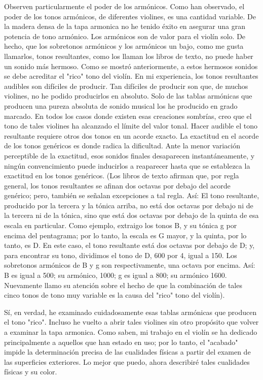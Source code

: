 \documentclass[12pt]{book}
\begin{document}
Observen particularmente el poder de los armónicos. Como han observado, el poder de los tonos armónicos, de diferentes violines, es una cantidad variable. De la madera densa de la tapa armonica no he tenido éxito en asegurar una gran potencia de tono armónico. Los armónicos son de valor para el violín solo. De hecho, que los sobretonos armónicos y los armónicos un bajo, como me gusta llamarlos, tonos resultantes, como los llaman los libros de texto, no puede haber un sonido más hermoso. Como se mostró anteriormente, a estos hermosos sonidos se debe acreditar el "rico" tono del violín. En mi experiencia, los tonos resultantes audibles son difíciles de producir. Tan difíciles de producir son que, de muchos violines, no he podido producirlos en absoluto. Solo de las tablas armónicas que producen una pureza absoluta de sonido musical los he producido en grado marcado. En todos los casos donde existen esas creaciones sombrías, creo que el tono de tales violines ha alcanzado el límite del valor tonal. Hacer audible el tono resultante requiere otros dos tonos en un acorde exacto. La exactitud en el acorde de los tonos genéricos es donde radica la dificultad. Ante la menor variación perceptible de la exactitud, esos sonidos finales desaparecen instantáneamente, y ningún convencimiento puede inducirlos a reaparecer hasta que se establezca la exactitud en los tonos genéricos. (Los libros de texto afirman que, por regla general, los tonos resultantes se afinan dos octavas por debajo del acorde genérico; pero, también se señalan excepciones a tal regla. Así: El tono resultante, producido por la tercera y la tónica arriba, no está dos octavas por debajo ni de la tercera ni de la tónica, sino que está dos octavas por debajo de la quinta de esa escala en particular. Como ejemplo, extraigo los tonos B, y su tónica g por encima del pentagrama; por lo tanto, la escala es G mayor, y la quinta, por lo tanto, es D. En este caso, el tono resultante está dos octavas por debajo de D; y, para encontrar su tono, dividimos el tono de D, 600 por 4, igual a 150. Los sobretonos armónicos de B y g son respectivamente, una octava por encima. Así: B es igual a 500; su armónico, 1000; g es igual a 800; su armónico 1600. Nuevamente llamo su atención sobre el hecho de que la combinación de tales cinco tonos de tono muy variable es la causa del "rico" tono del violín).

Sí, en verdad, he examinado cuidadosamente esas tablas armónicas que producen el tono "rico". Incluso he vuelto a abrir tales violines sin otro propósito que volver a examinar la tapa armonica. Como saben, mi trabajo en el violín se ha dedicado principalmente a aquellos que han estado en uso; por lo tanto, el "acabado" impide la determinación precisa de las cualidades físicas a partir del examen de las superficies exteriores. Lo mejor que puedo, ahora describiré tales cualidades físicas y su color.
\end{document}
